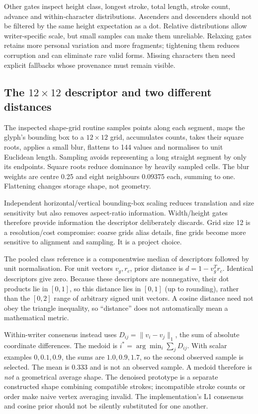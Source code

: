 Other gates inspect height class, longest stroke, total length, stroke count,
advance and within-character distributions. Ascenders and descenders should
not be filtered by the same height expectation as a dot. Relative distributions
allow writer-specific scale, but small samples can make them unreliable.
Relaxing gates retains more personal variation and more fragments; tightening
them reduces corruption and can eliminate rare valid forms. Missing characters
then need explicit fallbacks whose provenance must remain visible.

\subsection{The $12\times12$ descriptor and two different distances}
The inspected shape-grid routine samples points along each segment, maps
the glyph's bounding box to a $12\times12$ grid, accumulates counts, takes
their square roots, applies a small blur, flattens to 144 values and normalises
to unit Euclidean length. Sampling avoids representing a long straight segment
by only its endpoints. Square roots reduce dominance by heavily sampled cells.
The blur weights are centre 0.25 and eight neighbours 0.09375 each, summing
to one. Flattening changes storage shape, not geometry.

Independent horizontal/vertical bounding-box scaling reduces translation and
size sensitivity but also removes aspect-ratio information. Width/height gates
therefore provide information the descriptor deliberately discards. Grid size
12 is a resolution/cost compromise: coarse grids alias details, fine grids
become more sensitive to alignment and sampling. It is a project choice.

The pooled class reference is a componentwise median of descriptors followed
by unit normalisation. For unit vectors $v_g,r_c$, prior distance is
$d=1-v_g^Tr_c$. Identical descriptors give zero. Because these descriptors
are nonnegative, their dot products lie in $[0,1]$, so this distance lies in
$[0,1]$ (up to rounding), rather than the $[0,2]$ range of arbitrary signed
unit vectors. A cosine distance need not obey the triangle inequality, so
``distance'' does not automatically mean a mathematical metric.

Within-writer consensus instead uses $D_{ij}=\|v_i-v_j\|_1$, the sum of
absolute coordinate differences. The medoid is
$i^*=\arg\min_i\sum_jD_{ij}$. With scalar examples $0,0.1,0.9$, the sums
are $1.0,0.9,1.7$, so the second observed sample is selected.
The mean is 0.333 and is not an observed sample. A medoid therefore is
\emph{not} a geometrical average shape. The denoised prototype is a separate
constructed shape combining compatible strokes; incompatible stroke counts
or order make naive vertex averaging invalid. The implementation's L1
consensus and cosine prior should not be silently substituted for one another.

